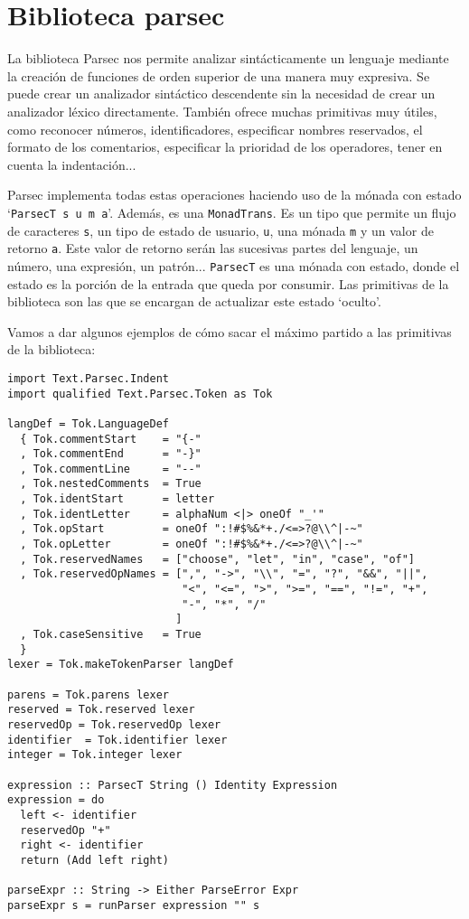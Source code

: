 \documentclass[class=article, crop=false]{standalone}
\begin{document}
\section{Biblioteca parsec}\label{sec:parsec}
La biblioteca Parsec nos permite analizar sintácticamente un lenguaje mediante la creación
de funciones de orden superior de una manera muy expresiva. Se puede crear un analizador
sintáctico descendente sin la necesidad de crear un analizador léxico directamente. También
ofrece muchas primitivas muy útiles, como reconocer números, identificadores, especificar
nombres reservados, el formato de los comentarios, especificar la prioridad de los
operadores, tener en cuenta la indentación...

Parsec implementa todas estas operaciones haciendo uso de la mónada con estado
`\verb`ParsecT s u m a`'. Además, es una \verb`MonadTrans`. Es un tipo que permite un flujo de
caracteres \verb`s`, un tipo de estado de usuario, \verb`u`, una mónada \verb`m` y un valor
de retorno \verb`a`. Este valor de retorno serán las sucesivas partes del lenguaje, un
número, una expresión, un patrón... \verb`ParsecT` es una mónada con estado, donde el estado
es la porción de la entrada que queda por consumir. Las primitivas de la biblioteca son las
que se encargan de actualizar este estado `oculto'.

Vamos a dar algunos ejemplos de cómo sacar el máximo partido a las primitivas de la
biblioteca:

\begin{verbatim}
import Text.Parsec.Indent
import qualified Text.Parsec.Token as Tok

langDef = Tok.LanguageDef
  { Tok.commentStart    = "{-"
  , Tok.commentEnd      = "-}"
  , Tok.commentLine     = "--"
  , Tok.nestedComments  = True
  , Tok.identStart      = letter
  , Tok.identLetter     = alphaNum <|> oneOf "_'"
  , Tok.opStart         = oneOf ":!#$%&*+./<=>?@\\^|-~"
  , Tok.opLetter        = oneOf ":!#$%&*+./<=>?@\\^|-~"
  , Tok.reservedNames   = ["choose", "let", "in", "case", "of"]
  , Tok.reservedOpNames = [",", "->", "\\", "=", "?", "&&", "||",
                           "<", "<=", ">", ">=", "==", "!=", "+",
                           "-", "*", "/"
                          ]
  , Tok.caseSensitive   = True
  }
lexer = Tok.makeTokenParser langDef

parens = Tok.parens lexer
reserved = Tok.reserved lexer
reservedOp = Tok.reservedOp lexer
identifier  = Tok.identifier lexer
integer = Tok.integer lexer

expression :: ParsecT String () Identity Expression
expression = do
  left <- identifier
  reservedOp "+"
  right <- identifier
  return (Add left right)

parseExpr :: String -> Either ParseError Expr
parseExpr s = runParser expression "" s
\end{verbatim}
\end{document}
